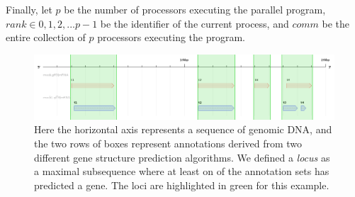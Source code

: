 \documentclass{bioinfo}
\begin{document}
Finally, let $p$ be the number of processors executing the parallel program, $rank \in 0,1,2,...p-1$ be the identifier of the current process, and $comm$ be the entire collection of $p$ processors executing the program.

\begin{figure}
  \begin{center}
    \includegraphics[width=500px]{data.png}
  \end{center}
  \caption{Here the horizontal axis represents a sequence of genomic DNA, and the two rows of boxes represent annotations derived from two different gene structure prediction algorithms. We defined a \textit{locus} as a maximal subsequence where at least on of the annotation sets has predicted a gene. The loci are highlighted in green for this example.}
\end{figure}
\end{document}
